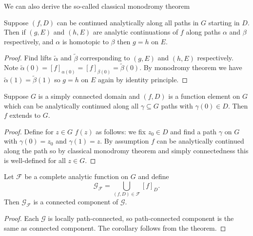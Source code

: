\documentclass[a4paper]{article}
\begin{document}
We can also derive the so-called classical monodromy theorem

\begin{theorem}
  Suppose \((f, D)\) can be continued analytically along all paths in \(G\) starting in \(D\). Then if \((g, E)\) and \((h, E)\) are analytic continuations of \(f\) along paths \(\alpha\) and \(\beta\) respectively, and \(\alpha\) is homotopic to \(\beta\) then \(g = h\) on \(E\).
\end{theorem}

\begin{proof}
  Find lifts \(\tilde \alpha\) and \(\tilde \beta\) corresponding to \((g, E)\) and \((h, E)\) respectively. Note \(\tilde \alpha(0) = [f]_{\alpha(0)} = [f]_{\beta(0)} = \tilde \beta(0)\). By monodromy theorem we have \(\tilde \alpha(1) = \tilde \beta(1)\) so \(g = h\) on \(E\) again by identity principle.
\end{proof}

\begin{corollary}
  Suppose \(G\) is a simply connected domain and \((f, D)\) is a function element on \(G\) which can be analytically continued along all \(\gamma \subseteq G\) paths with \(\gamma(0) \in D\). Then \(f\) extends to \(G\).
\end{corollary}

\begin{proof}
  Define for \(z \in G\) \(f(z)\) as follows: we fix \(z_0 \in D\) and find a path \(\gamma\) on \(G\) with \(\gamma(0) = z_0\) and \(\gamma(1) = z\). By assumption \(f\) can be analytically continued along the path so by classical monodromy theorem and simply connectedness this is well-defined for all \(z \in G\).
\end{proof}





\begin{corollary}
  Let \(\mathcal F\) be a complete analytic function on \(G\) and define
  \[
    \mathcal G_{\mathcal F} = \bigcup_{(f, D) \in \mathcal F} [f]_D.
  \]
  Then \(\mathcal G_{\mathcal F}\) is a connected component of \(\mathcal G\).
\end{corollary}

\begin{proof}
  Each \(\mathcal G\) is locally path-connected, so path-connected component is the same as connected component. The corollary follows from the theorem.
\end{proof}
\end{document}
